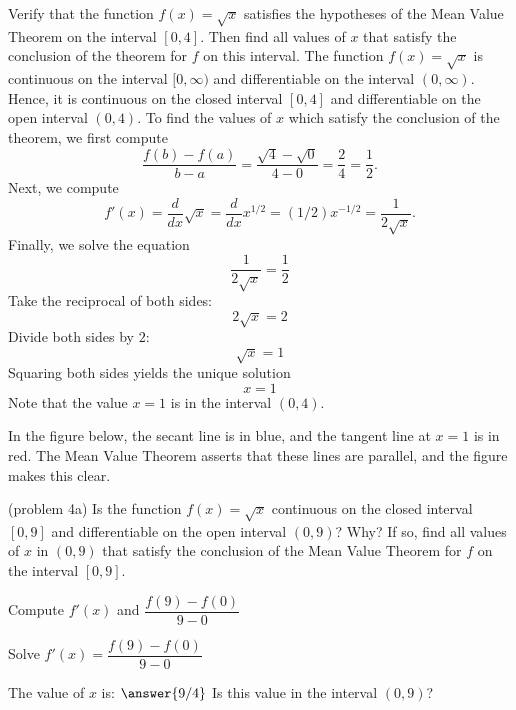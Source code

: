 \documentclass[handout]{ximera}
\begin{document}
\begin{example}[example 4]
Verify that the function $f(x) = \sqrt x$ satisfies the hypotheses of the Mean Value Theorem
on the interval $[0,4]$. Then find all values of $x$ that satisfy the conclusion of the theorem for $f$ on this interval.
The function $f(x) = \sqrt x$ is continuous on the interval $[0, \infty)$  and differentiable on the interval $(0, \infty)$. 
Hence, it is continuous on the closed interval $[0, 4]$ and differentiable on the open interval $(0, 4)$. 
To find the values of $x$ which satisfy the conclusion of the theorem, we first compute
\[\frac{f(b) - f(a)}{b-a} = \frac{\sqrt 4 - \sqrt 0}{4-0} = \frac{2}{4} = \frac{1}{2}.\]
Next, we compute
\[f'(x) = \frac{d}{dx} \sqrt x = \frac{d}{dx} x^{1/2} = (1/2)x^{-1/2} = \frac{1}{2\sqrt x}.\]
Finally, we solve the equation
\[\frac{1}{2\sqrt x} = \frac{1}{2}\]
Take the reciprocal of both sides:
\[2\sqrt x = 2\]
Divide both sides by $2$: 
\[\sqrt x = 1\]
Squaring both sides yields the unique solution
\[ x=1\]
Note that the value $x = 1$ is in the interval $(0,4)$.

In the figure below, the secant line is in blue, 
and the tangent line at $x = 1$ is in red. The Mean Value Theorem asserts that these lines are parallel, and the figure makes this clear.

\begin{image}
\end{image}


\end{example}

\begin{problem}(problem 4a)
  Is the function $f(x) = \sqrt x$ continuous on the closed interval $[0,9]$ and differentiable on the open interval $(0,9)$? Why?
  If so, find all values of $x$ in $(0,9)$ that satisfy the conclusion of the Mean Value Theorem for $f$ on the interval $[0,9]$.
	
    \begin{hint}
      Compute $f'(x)$ and $\dfrac{f(9) - f(0)}{9-0}$
    \end{hint}
		\begin{hint}
		  Solve $f'(x) = \dfrac{f(9) - f(0)}{9-0}$
		\end{hint}
		
		The value of $x$ is:
		 $\answer{9/4}$
     Is this value in the interval $(0,9)$?
\end{problem}
\end{document}
